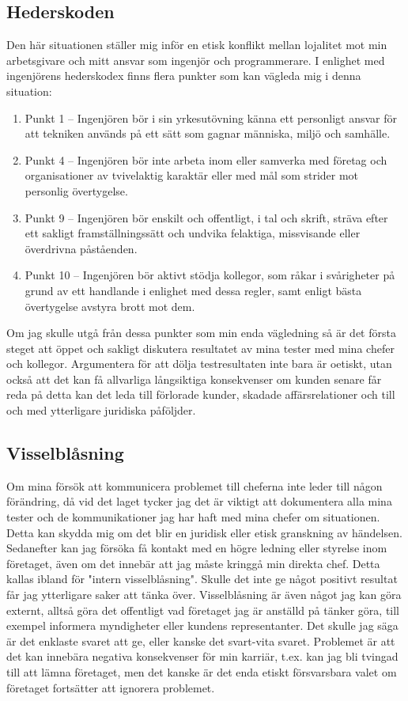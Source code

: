 \documentclass[a4paper,12pt]{article}
\begin{document}
\subsection*{Hederskoden}
Den här situationen ställer mig inför en etisk konflikt mellan lojalitet mot
min arbetsgivare och mitt ansvar som ingenjör och programmerare. I enlighet med
ingenjörens hederskodex \cite{heder} finns flera punkter som kan vägleda mig i denna
situation:
\begin{enumerate}
    \item Punkt 1 – Ingenjören bör i sin yrkesutövning känna ett personligt
    ansvar för att tekniken används på ett sätt som gagnar människa, miljö och
    samhälle.
    \item Punkt 4 – Ingenjören bör inte arbeta inom eller samverka med företag
    och organisationer av tvivelaktig karaktär eller med mål som strider mot
    personlig övertygelse. 
    \item Punkt 9 – Ingenjören bör enskilt och offentligt, i tal och skrift,
    sträva efter ett sakligt framställningssätt och undvika felaktiga,
    missvisande eller överdrivna påståenden.
    \item Punkt 10 – Ingenjören bör aktivt stödja kollegor, som råkar i
    svårigheter på grund av ett handlande i enlighet med dessa regler, samt
    enligt bästa övertygelse avstyra brott mot dem.
\end{enumerate}
Om jag skulle utgå från dessa punkter som min enda vägledning så är det första
steget att öppet och sakligt diskutera resultatet av mina tester med mina
chefer och kollegor. Argumentera för att dölja testresultaten inte bara är
oetiskt, utan också att det kan få allvarliga långsiktiga konsekvenser om
kunden senare får reda på detta kan det leda till förlorade kunder, skadade
affärsrelationer och till och med ytterligare juridiska påföljder.
%
\subsection*{Visselblåsning}
Om mina försök att kommunicera problemet till cheferna inte leder till någon
förändring, då vid det laget tycker jag det är viktigt att dokumentera alla
mina tester och de kommunikationer jag har haft med mina chefer om situationen.
Detta kan skydda mig om det blir en juridisk eller etisk granskning av
händelsen. Sedanefter kan jag försöka få kontakt med en högre ledning eller
styrelse inom företaget, även om det innebär att jag måste kringgå min direkta
chef. Detta kallas ibland för "intern visselblåsning". Skulle det inte ge något
positivt resultat får jag ytterligare saker att tänka över. Visselblåsning är
även något jag kan göra externt, alltså göra det offentligt vad företaget jag
är anställd på tänker göra, till exempel informera myndigheter eller kundens
representanter. Det skulle jag säga är det enklaste svaret att ge, eller kanske
det svart-vita svaret.  Problemet är att det kan innebära negativa konsekvenser
för min karriär, t.ex.  kan jag bli tvingad till att lämna företaget, men det
kanske är det enda etiskt försvarsbara valet om företaget fortsätter att
ignorera problemet.
%
\end{document}

